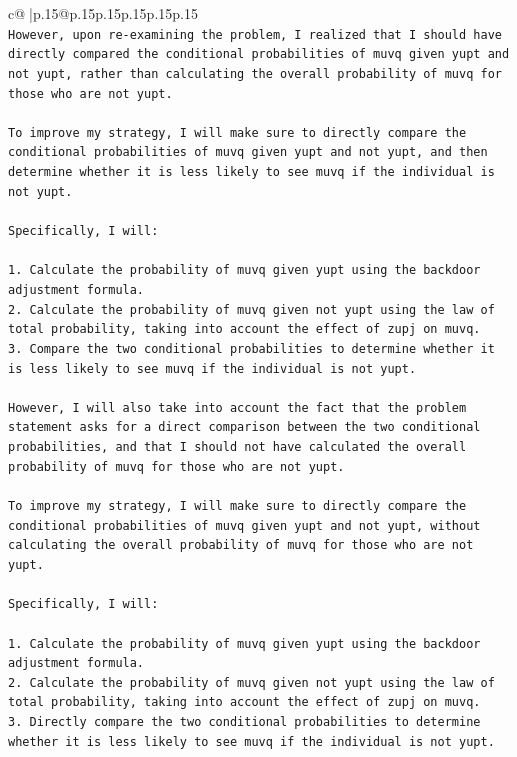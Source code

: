 \documentclass{article}
\begin{document}
{\begin{supertabular}{c@{$\;$}|p{.15\linewidth}@{}p{.15\linewidth}p{.15\linewidth}p{.15\linewidth}p{.15\linewidth}p{.15\linewidth}}
{{{\\ 
\texttt{However, upon re{-}examining the problem, I realized that I should have directly compared the conditional probabilities of muvq given yupt and not yupt, rather than calculating the overall probability of muvq for those who are not yupt. } \\
\\ 
\texttt{To improve my strategy, I will make sure to directly compare the conditional probabilities of muvq given yupt and not yupt, and then determine whether it is less likely to see muvq if the individual is not yupt. } \\
\\ 
\texttt{Specifically, I will:} \\
\\ 
\texttt{1. Calculate the probability of muvq given yupt using the backdoor adjustment formula.} \\
\texttt{2. Calculate the probability of muvq given not yupt using the law of total probability, taking into account the effect of zupj on muvq.} \\
\texttt{3. Compare the two conditional probabilities to determine whether it is less likely to see muvq if the individual is not yupt.} \\
\\ 
\texttt{However, I will also take into account the fact that the problem statement asks for a direct comparison between the two conditional probabilities, and that I should not have calculated the overall probability of muvq for those who are not yupt. } \\
\\ 
\texttt{To improve my strategy, I will make sure to directly compare the conditional probabilities of muvq given yupt and not yupt, without calculating the overall probability of muvq for those who are not yupt. } \\
\\ 
\texttt{Specifically, I will:} \\
\\ 
\texttt{1. Calculate the probability of muvq given yupt using the backdoor adjustment formula.} \\
\texttt{2. Calculate the probability of muvq given not yupt using the law of total probability, taking into account the effect of zupj on muvq.} \\
\texttt{3. Directly compare the two conditional probabilities to determine whether it is less likely to see muvq if the individual is not yupt.} \\
}}}
\end{supertabular}}
\end{document}
